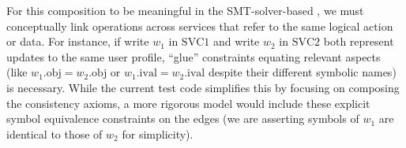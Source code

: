 
For this composition to be meaningful in the SMT-solver-based
\sysname{}, we must
conceptually link operations across services that refer to the same logical
action or data. For instance, if write $w_1$ in $\text{SVC}1$ and
write $w_2$ in $\text{SVC}2$ both
represent updates to the same user profile, ``glue'' constraints
equating relevant
aspects (like $w_1.\text{obj} = w_2.\text{obj}$ or $w_1.\text{ival} =
w_2.\text{ival}$ despite their different symbolic names) is necessary.
While the current test code
simplifies this by focusing on composing the consistency axioms, a more rigorous
model would include these explicit symbol equivalence constraints on the edges
(we are asserting symbols of $w_1$ are identical to those of $w_2$ for
simplicity).


